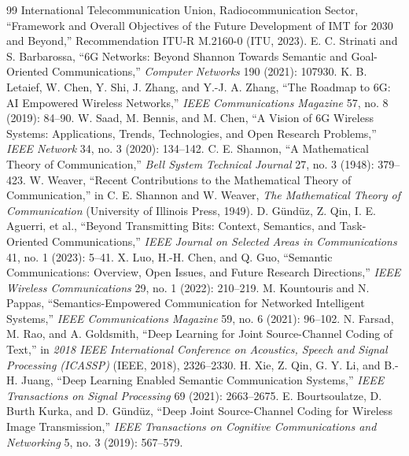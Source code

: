 \begin{thebibliography}{99}
 International Telecommunication Union, Radiocommunication Sector, ``Framework and Overall Objectives of the Future Development of IMT for 2030 and Beyond,'' Recommendation ITU-R M.2160-0 (ITU, 2023).
 E. C. Strinati and S. Barbarossa, ``6G Networks: Beyond Shannon Towards Semantic and Goal-Oriented Communications,'' \textit{Computer Networks} 190 (2021): 107930.
 K. B. Letaief, W. Chen, Y. Shi, J. Zhang, and Y.-J. A. Zhang, ``The Roadmap to 6G: AI Empowered Wireless Networks,'' \textit{IEEE Communications Magazine} 57, no. 8 (2019): 84--90.
 W. Saad, M. Bennis, and M. Chen, ``A Vision of 6G Wireless Systems: Applications, Trends, Technologies, and Open Research Problems,'' \textit{IEEE Network} 34, no. 3 (2020): 134--142.
 C. E. Shannon, ``A Mathematical Theory of Communication,'' \textit{Bell System Technical Journal} 27, no. 3 (1948): 379--423.
 W. Weaver, ``Recent Contributions to the Mathematical Theory of Communication,'' in C. E. Shannon and W. Weaver, \textit{The Mathematical Theory of Communication} (University of Illinois Press, 1949).
 D. G\"und\"uz, Z. Qin, I. E. Aguerri, et al., ``Beyond Transmitting Bits: Context, Semantics, and Task-Oriented Communications,'' \textit{IEEE Journal on Selected Areas in Communications} 41, no. 1 (2023): 5--41.
 X. Luo, H.-H. Chen, and Q. Guo, ``Semantic Communications: Overview, Open Issues, and Future Research Directions,'' \textit{IEEE Wireless Communications} 29, no. 1 (2022): 210--219.
 M. Kountouris and N. Pappas, ``Semantics-Empowered Communication for Networked Intelligent Systems,'' \textit{IEEE Communications Magazine} 59, no. 6 (2021): 96--102.
 N. Farsad, M. Rao, and A. Goldsmith, ``Deep Learning for Joint Source-Channel Coding of Text,'' in \textit{2018 IEEE International Conference on Acoustics, Speech and Signal Processing (ICASSP)} (IEEE, 2018), 2326--2330.
 H. Xie, Z. Qin, G. Y. Li, and B.-H. Juang, ``Deep Learning Enabled Semantic Communication Systems,'' \textit{IEEE Transactions on Signal Processing} 69 (2021): 2663--2675.
 E. Bourtsoulatze, D. Burth Kurka, and D. G\"und\"uz, ``Deep Joint Source-Channel Coding for Wireless Image Transmission,'' \textit{IEEE Transactions on Cognitive Communications and Networking} 5, no. 3 (2019): 567--579.

\end{thebibliography}
